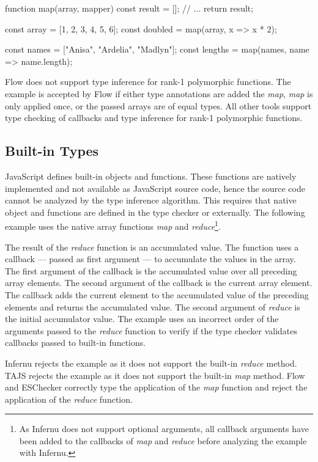 \begin{javascriptcode}
function map(array, mapper) {
	const result = [];
	// ... 
	return result;
}

const array = [1, 2, 3, 4, 5, 6];
const doubled = map(array, x => x * 2);

const names = ["Anisa", "Ardelia", "Madlyn"];
const lengths = map(names, name => name.length);
\end{javascriptcode}

Flow does not support type inference for rank-1 polymorphic functions. The example is accepted by Flow if either type annotations are added the \textit{map}, \textit{map} is only applied once, or the passed arrays are of equal types. All other tools support type checking of callbacks and type inference for rank-1 polymorphic functions.

\subsection{Built-in Types}\label{ssec:built-in-types}
JavaScript defines built-in objects and functions. These functions are natively implemented and not available as JavaScript source code, hence the source code cannot be analyzed by the type inference algorithm. This requires that native object and functions are defined in the type checker or externally. The following example uses the native array functions \textit{map} and \textit{reduce}\footnote{As Infernu does not support optional arguments, all callback arguments have been added to the callbacks of \textit{map} and \textit{reduce} before analyzing the example with Infernu.}. 

The result of the \textit{reduce} function is an accumulated value. The function uses a callback --- passed as first argument --- to accumulate the values in the array. The first argument of the callback is the accumulated value over all preceding array elements. The second argument of the callback is the current array element. The callback adds the current element to the accumulated value of the preceding elements and returns the accumulated value. The second argument of \textit{reduce} is the initial accumulator value. The example uses an incorrect order of the arguments passed to the \textit{reduce} function to verify if the type checker validates callbacks passed to built-in functions.


Infernu rejects the example as it does not support the built-in \textit{reduce} method. TAJS rejects the example as it does not support the built-in \textit{map} method. Flow and ESChecker correctly type the application of the \textit{map} function and reject the application of the \textit{reduce} function.

